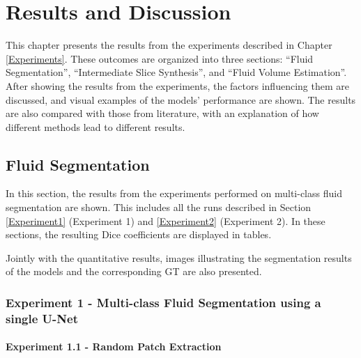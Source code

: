 \chapter{Results and Discussion}\label{ResultsDiscussion}

This chapter presents the results from the experiments described in Chapter \ref{Experiments}. These outcomes are organized into three sections: ``Fluid Segmentation'', ``Intermediate Slice Synthesis'', and ``Fluid Volume Estimation''. After showing the results from the experiments, the factors influencing them are discussed, and visual examples of the models' performance are shown. The results are also compared with those from literature, with an explanation of how different methods lead to different results.

\section{Fluid Segmentation}\label{FluidSegmentation}
In this section, the results from the experiments performed on multi-class fluid segmentation are shown. This includes all the runs described in Section \ref{Experiment1} (Experiment 1) and \ref{Experiment2} (Experiment 2). In these sections, the resulting Dice coefficients are displayed in tables.
\par
Jointly with the quantitative results, images illustrating the segmentation results of the models and the corresponding GT are also presented.

\subsection{Experiment 1 - Multi-class Fluid Segmentation using a single U-Net}

\subsubsection{Experiment 1.1 - Random Patch Extraction}

